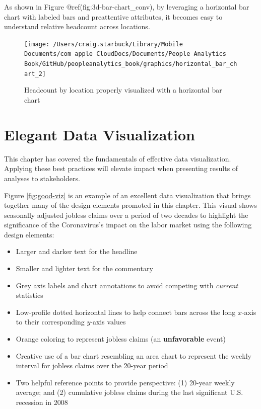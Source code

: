 \documentclass[
]{book}
\providecommand{\tightlist}{%
  \setlength{\itemsep}{0pt}\setlength{\parskip}{0pt}}
\begin{document}
As shown in Figure @ref(fig:3d-bar-chart\_conv), by leveraging a horizontal bar chart with labeled bars and preattentive attributes, it becomes easy to understand relative headcount across locations.

\begin{figure}

{\centering \texttt{[image: /Users/craig.starbuck/Library/Mobile Documents/com~apple~CloudDocs/Documents/People Analytics Book/GitHub/peopleanalytics\_book/graphics/horizontal\_bar\_chart\_2]} 

}

\caption{Headcount by location properly visualized with a horizontal bar chart}\label{fig:3d-bar-chart-conv}
\end{figure}

\hypertarget{elegant-data-visualization}{%
\section{Elegant Data Visualization}\label{elegant-data-visualization}}

This chapter has covered the fundamentals of effective data visualization. Applying these best practices will elevate impact when presenting results of analyses to stakeholders.

Figure \ref{fig:good-viz} is an example of an excellent data visualization that brings together many of the design elements promoted in this chapter. This visual shows seasonally adjusted jobless claims over a period of two decades to highlight the significance of the Coronavirus's impact on the labor market using the following design elements:

\begin{itemize}
\tightlist
\item
  Larger and darker text for the headline
\item
  Smaller and lighter text for the commentary
\item
  Grey axis labels and chart annotations to avoid competing with \emph{current} statistics
\item
  Low-profile dotted horizontal lines to help connect bars across the long \(x\)-axis to their corresponding \(y\)-axis values
\item
  Orange coloring to represent jobless claims (an \textbf{unfavorable} event)
\item
  Creative use of a bar chart resembling an area chart to represent the weekly interval for jobless claims over the 20-year period
\item
  Two helpful reference points to provide perspective: (1) 20-year weekly average; and (2) cumulative jobless claims during the last significant U.S. recession in 2008
\end{itemize}
\end{document}
